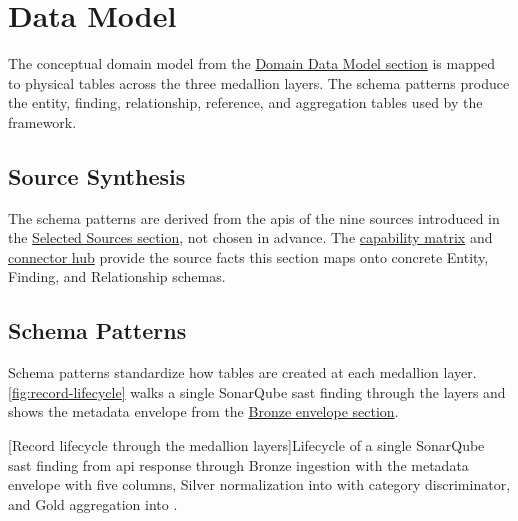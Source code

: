 
\section{Data Model}
\label{sec:data-model}

The conceptual domain model from the \hyperref[sec:data-entities]{Domain Data Model section} is mapped to physical tables across the three medallion layers. The schema patterns produce the entity, finding, relationship, reference, and aggregation tables used by the framework.


\subsection{Source Synthesis}

The schema patterns are derived from the \glspl{api} of the nine sources introduced in the \hyperref[sec:selected-sources]{Selected Sources section}, not chosen in advance. The \href{https://vkraus.github.io/appsec-mvp/platform/reference/source-capability-matrix/}{capability matrix} and \href{https://vkraus.github.io/appsec-mvp/connectors/}{connector hub} provide the source facts this section maps onto concrete Entity, Finding, and Relationship schemas.


\subsection{Schema Patterns}
\label{sec:schema-patterns}

Schema patterns standardize how tables are created at each medallion layer. \autoref{fig:record-lifecycle} walks a single SonarQube \gls{sast} finding through the layers and shows the metadata envelope from the \hyperref[sec:bronze-pattern]{Bronze envelope section}.

\begin{center}
\begin{minipage}{\textwidth}
\centering

[Record lifecycle through the medallion layers]{Lifecycle of a single SonarQube \gls{sast} finding from \gls{api} response through Bronze ingestion with the metadata envelope with five columns, Silver normalization into  with category discriminator, and Gold aggregation into .}
\label{fig:record-lifecycle}
\end{minipage}
\end{center}

